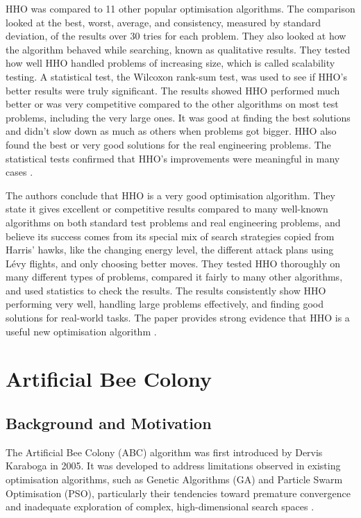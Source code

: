 \documentclass[a4paper, 12pt]{extarticle}
\begin{document}
HHO was compared to 11 other popular optimisation algorithms. The comparison looked at the best, worst, average, and consistency, measured by standard deviation, of the results over 30 tries for each problem. They also looked at how the algorithm behaved while searching, known as qualitative results. They tested how well HHO handled problems of increasing size, which is called scalability testing. A statistical test, the Wilcoxon rank-sum test, was used to see if HHO's better results were truly significant. The results showed HHO performed much better or was very competitive compared to the other algorithms on most test problems, including the very large ones. It was good at finding the best solutions and didn't slow down as much as others when problems got bigger. HHO also found the best or very good solutions for the real engineering problems. The statistical tests confirmed that HHO's improvements were meaningful in many cases \cite{heidari2019harris}.

The authors conclude that HHO is a very good optimisation algorithm. They state it gives excellent or competitive results compared to many well-known algorithms on both standard test problems and real engineering problems, and believe its success comes from its special mix of search strategies copied from Harris' hawks, like the changing energy level, the different attack plans using Lévy flights, and only choosing better moves. They tested HHO thoroughly on many different types of problems, compared it fairly to many other algorithms, and used statistics to check the results. The results consistently show HHO performing very well, handling large problems effectively, and finding good solutions for real-world tasks. The paper provides strong evidence that HHO is a useful new optimisation algorithm \cite{heidari2019harris}.

\newpage
\section{Artificial Bee Colony}

\subsection{Background and Motivation}
The Artificial Bee Colony (ABC) algorithm was first introduced by Dervis Karaboga in 2005. It was developed to address limitations observed in existing optimisation algorithms, such as Genetic Algorithms (GA) and Particle Swarm Optimisation (PSO), particularly their tendencies toward premature convergence and inadequate exploration of complex, high-dimensional search spaces \cite{karaboga2007powerful}.
\end{document}

